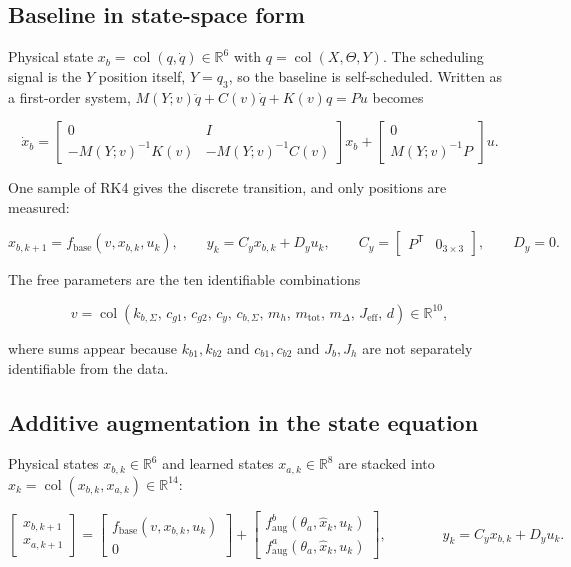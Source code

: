 \documentclass[12pt]{article}
\newcommand{\R}{\mathbb{R}}
\newcommand{\T}{\mathsf{T}}
\DeclareMathOperator{\col}{col}
\newcommand{\fbase}{f_{\mathrm{base}}}
\newcommand{\faug}{f_{\mathrm{aug}}}
\newcommand{\panel}[1]{\subsection*{\Large #1}\vspace{1mm}}
\begin{document}
\panel{Baseline in state-space form}

Physical state $x_b=\col(q,\dot q)\in\R^{6}$ with $q=\col(X,\Theta,Y)$. The
scheduling signal is the $Y$ position itself, $Y=q_3$, so the baseline is
self-scheduled. Written as a first-order system,
$M(Y;v)\ddot q+C(v)\dot q+K(v)q=Pu$ becomes

\begin{equation*}
\dot x_b
=
\left[\begin{array}{cc}
0 & I\\[2.5mm]
-M(Y;v)^{-1}K(v) & -M(Y;v)^{-1}C(v)
\end{array}\right]
x_b
+
\left[\begin{array}{c}
0\\[2.5mm] M(Y;v)^{-1}P
\end{array}\right]
u .
\end{equation*}

One sample of RK4 gives the discrete transition, and only positions are
measured:

\begin{equation*}
x_{b,k+1}=\fbase(v,x_{b,k},u_k),
\qquad
y_k=C_y x_{b,k}+D_y u_k,
\qquad
C_y=\begin{bmatrix}P^{\T} & 0_{3\times 3}\end{bmatrix},
\qquad
D_y=0 .
\end{equation*}

The free parameters are the ten identifiable combinations

\begin{equation*}
v=\col\!\left(k_{b,\Sigma},\,c_{g1},\,c_{g2},\,c_y,\,c_{b,\Sigma},\,m_h,\,
m_{\mathrm{tot}},\,m_{\Delta},\,J_{\mathrm{eff}},\,d\right)\in\R^{10},
\end{equation*}

where sums appear because $k_{b1},k_{b2}$ and $c_{b1},c_{b2}$ and $J_b,J_h$ are
not separately identifiable from the data.

\newpage
\panel{Additive augmentation in the state equation}

Physical states $x_{b,k}\in\R^{6}$ and learned states $x_{a,k}\in\R^{8}$ are
stacked into $\widehat x_k=\col(x_{b,k},x_{a,k})\in\R^{14}$:

\begin{equation*}
\begin{bmatrix}x_{b,k+1}\\[1.5mm] x_{a,k+1}\end{bmatrix}
=
\begin{bmatrix}\fbase(v,x_{b,k},u_k)\\[1.5mm] 0\end{bmatrix}
+
\begin{bmatrix}
\faug^{b}(\theta_a,\widehat x_k,u_k)\\[1.5mm]
\faug^{a}(\theta_a,\widehat x_k,u_k)
\end{bmatrix},
\qquad\qquad
y_k=C_y x_{b,k}+D_y u_k .
\end{equation*}
\end{document}
